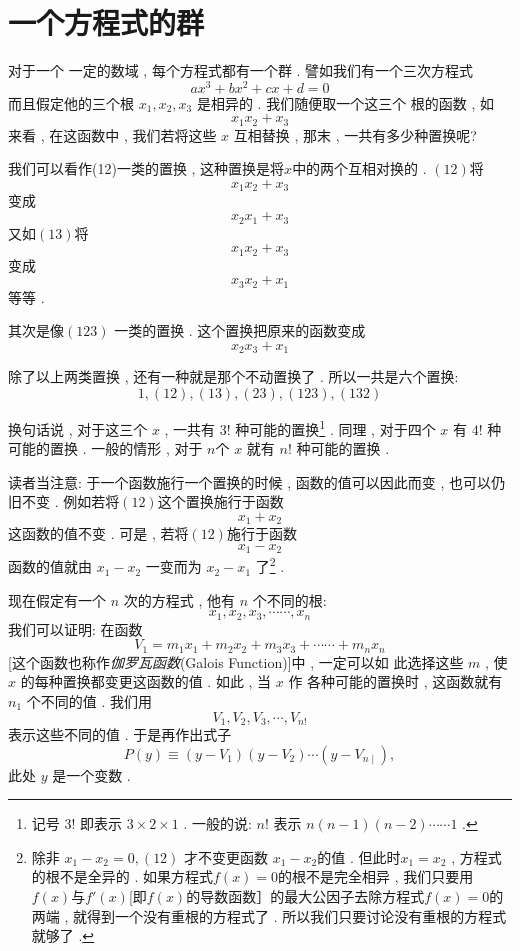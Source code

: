 \section{一个方程式的群}

对于一个 一定的数域 , 每个方程式都有一个群 .  譬如我们有一个三次方程式
\[
a x^{3}+b x^{2}+c x+d=0
\]
而且假定他的三个根 $x_{1} ,  x_{2} ,  x_{3}$ 是相异的 . 我们随便取一个这三个 根的函数 , 如
\[
x_{1} x_{2}+x_{3}
\]
来看 , 在这函数中 , 我们若将这些 $x$ 互相替换 , 那末 , 一共有多少种置换呢?

我们可以看作(12)一类的置换 , 这种置换是将$x$中的两个互相对换的 . $(12)$将
\[
x_{1} x_{2}+x_{3}
\]
变成
\[
x_{2} x_{1}+x_{3}
\]
又如$(13)$将
\[
x_{1} x_{2}+x_{3}
\]
变成
\[
x_{3} x_{2}+x_{1}
\]
等等 . 

其次是像$(123)$ 一类的置换 . 这个置换把原来的函数变成
\[
x_{2} x_{3}+x_{1}
\]

除了以上两类置换 , 还有一种就是那个不动置换了 . 所以一共是六个置换:
\[
1 , (12) , (13) , (23) , (123) , (132)
\]

换句话说 , 对于这三个 $x$ , 一共有 $3!$ 种可能的置换\footnote{记号 $3!$ 即表示 $3 \times 2 \times 1$  . 一般的说: $n !$ 表示 $n(n-1)(n-2) \cdots \cdots 1$ . } .  同理 , 对于四个 $x$ 有 $4!$ 种可能的置换 . 一般的情形 , 对于 $n$个 $x$ 就有 $n!$ 种可能的置换 . 

读者当注意: 于一个函数施行一个置换的时候 ,  函数的值可以因此而变 , 也可以仍旧不变 . 例如若将$(12)$这个置换施行于函数
\[
x_{1}+x_{2}
\]
这函数的值不变 . 可是 , 若将$(12)$施行于函数
\[
x_{1}-x_{2}
\]
函数的值就由 $x_{1}-x_{2}$ 一变而为 $x_{2}-x_{1}$ 了\footnote{除非 $x_{1}-x_{2}=0 , (12)$ 才不变更函数 $x_{1}-x_{2}$的值 . 但此时$x_{1}=x_{2}$ , 方程式的根不是全异的 . 如果方程式$f(x)=0$的根不是完全相异 , 我们只要用$f(x)$与$f'(x)$[即$f(x)$的导数函数］的最大公因子去除方程式$f(x)=0$的两端 , 就得到一个没有重根的方程式了 . 所以我们只要讨论没有重根的方程式就够了 . } . 

现在假定有一个 $n$ 次的方程式 , 他有 $n$ 个不同的根:
\[
x_{1} ,  x_{2} ,  x_{3} ,  \cdots \cdots ,  x_{n}
\]
我们可以证明: 在函数
\[
V_{1}=m_{1} x_{1}+m_{2} x_{2}+m_{3} x_{3}+\cdots \cdots+m_{n} x_{n}
\]
[这个函数也称作\emph{伽罗瓦函数}(Galois Function)]中 , 一定可以如
此选择这些 $m$ ,  使 $x$ 的每种置换都变更这函数的值 . 如此 , 当 $x$ 作
各种可能的置换时 , 这函数就有 $n_{1}$ 个不同的值 . 我们用
\[
V_{1} ,  V_{2} ,  V_{3} ,  \cdots ,  V_{n!}
\]
表示这些不同的值 . 于是再作出式子
\[
P(y) \equiv\left(y-V_{1}\right)\left(y-V_{2}\right) \cdots \left(y-V_{n \mid}\right) , 
\]
此处 $y$ 是一个变数 . 

